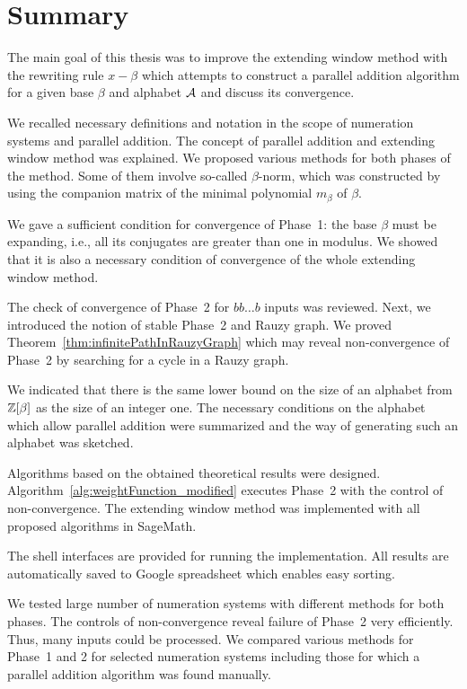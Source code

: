 \chapter*{\vspace{-30pt}Summary}
The main goal of this thesis was to improve the extending window method with the rewriting rule $x-\beta$ which attempts to construct a parallel addition algorithm for a given base $\beta$ and alphabet $\mathcal{A}$ and discuss its convergence.

We  recalled necessary definitions and notation in the scope of numeration systems and parallel addition. The concept of parallel addition and extending  window method was explained. We proposed various methods for both phases of the method. Some of them involve so-called $\beta$-norm, which was constructed by using the companion matrix of the minimal polynomial $m_\beta$ of $\beta$.

We gave a sufficient condition for convergence of Phase~1: the base $\beta$ must be expanding, i.e., all its conjugates are greater than one in modulus. We showed that it is also a necessary condition of convergence of the whole extending window method. 

The check of convergence of Phase~2 for $bb\dots b$ inputs was reviewed. Next, we introduced the notion of stable Phase~2 and  Rauzy graph. We proved Theorem~\ref{thm:infinitePathInRauzyGraph} which may reveal non-convergence of Phase~2 by searching for a cycle in a Rauzy graph.

We indicated that there is the same lower bound on the size of an alphabet from $\mathbb{Z}[\beta]$ as the size of an integer one. The necessary conditions on the alphabet which allow parallel addition were summarized and the way of generating such an alphabet was sketched.

Algorithms based on the obtained theoretical results were designed. Algorithm~\ref{alg:weightFunction_modified} executes Phase~2 with the control of non-convergence. The extending window method was implemented with all proposed algorithms in SageMath.

The shell interfaces are provided for running the implementation. All results are automatically saved to Google spreadsheet which enables easy sorting.

We tested large number of numeration systems with different methods for both phases. The controls of non-convergence reveal failure of Phase~2 very efficiently. Thus, many inputs could be processed. We compared various methods for Phase~1 and 2 for selected numeration systems including those for which a parallel addition algorithm was found manually.

